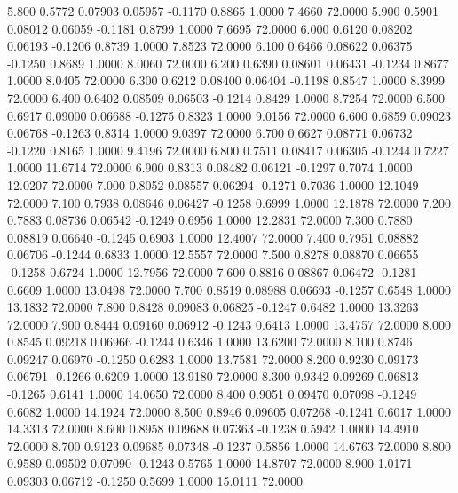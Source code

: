    5.800   0.5772   0.07903   0.05957  -0.1170   0.8865   1.0000   7.4660  72.0000
   5.900   0.5901   0.08012   0.06059  -0.1181   0.8799   1.0000   7.6695  72.0000
   6.000   0.6120   0.08202   0.06193  -0.1206   0.8739   1.0000   7.8523  72.0000
   6.100   0.6466   0.08622   0.06375  -0.1250   0.8689   1.0000   8.0060  72.0000
   6.200   0.6390   0.08601   0.06431  -0.1234   0.8677   1.0000   8.0405  72.0000
   6.300   0.6212   0.08400   0.06404  -0.1198   0.8547   1.0000   8.3999  72.0000
   6.400   0.6402   0.08509   0.06503  -0.1214   0.8429   1.0000   8.7254  72.0000
   6.500   0.6917   0.09000   0.06688  -0.1275   0.8323   1.0000   9.0156  72.0000
   6.600   0.6859   0.09023   0.06768  -0.1263   0.8314   1.0000   9.0397  72.0000
   6.700   0.6627   0.08771   0.06732  -0.1220   0.8165   1.0000   9.4196  72.0000
   6.800   0.7511   0.08417   0.06305  -0.1244   0.7227   1.0000  11.6714  72.0000
   6.900   0.8313   0.08482   0.06121  -0.1297   0.7074   1.0000  12.0207  72.0000
   7.000   0.8052   0.08557   0.06294  -0.1271   0.7036   1.0000  12.1049  72.0000
   7.100   0.7938   0.08646   0.06427  -0.1258   0.6999   1.0000  12.1878  72.0000
   7.200   0.7883   0.08736   0.06542  -0.1249   0.6956   1.0000  12.2831  72.0000
   7.300   0.7880   0.08819   0.06640  -0.1245   0.6903   1.0000  12.4007  72.0000
   7.400   0.7951   0.08882   0.06706  -0.1244   0.6833   1.0000  12.5557  72.0000
   7.500   0.8278   0.08870   0.06655  -0.1258   0.6724   1.0000  12.7956  72.0000
   7.600   0.8816   0.08867   0.06472  -0.1281   0.6609   1.0000  13.0498  72.0000
   7.700   0.8519   0.08988   0.06693  -0.1257   0.6548   1.0000  13.1832  72.0000
   7.800   0.8428   0.09083   0.06825  -0.1247   0.6482   1.0000  13.3263  72.0000
   7.900   0.8444   0.09160   0.06912  -0.1243   0.6413   1.0000  13.4757  72.0000
   8.000   0.8545   0.09218   0.06966  -0.1244   0.6346   1.0000  13.6200  72.0000
   8.100   0.8746   0.09247   0.06970  -0.1250   0.6283   1.0000  13.7581  72.0000
   8.200   0.9230   0.09173   0.06791  -0.1266   0.6209   1.0000  13.9180  72.0000
   8.300   0.9342   0.09269   0.06813  -0.1265   0.6141   1.0000  14.0650  72.0000
   8.400   0.9051   0.09470   0.07098  -0.1249   0.6082   1.0000  14.1924  72.0000
   8.500   0.8946   0.09605   0.07268  -0.1241   0.6017   1.0000  14.3313  72.0000
   8.600   0.8958   0.09688   0.07363  -0.1238   0.5942   1.0000  14.4910  72.0000
   8.700   0.9123   0.09685   0.07348  -0.1237   0.5856   1.0000  14.6763  72.0000
   8.800   0.9589   0.09502   0.07090  -0.1243   0.5765   1.0000  14.8707  72.0000
   8.900   1.0171   0.09303   0.06712  -0.1250   0.5699   1.0000  15.0111  72.0000
